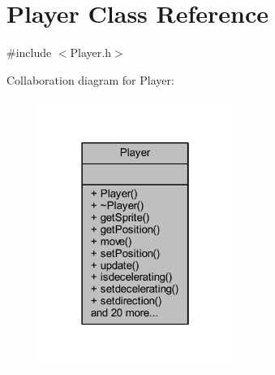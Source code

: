\hypertarget{class_player}{}\section{Player Class Reference}
\label{class_player}


{\ttfamily \#include $<$Player.\+h$>$}



Collaboration diagram for Player\+:
\nopagebreak
\begin{figure}[H]
\begin{center}
\leavevmode
\includegraphics[width=178pt]{class_player__coll__graph}
\end{center}
\end{figure}
